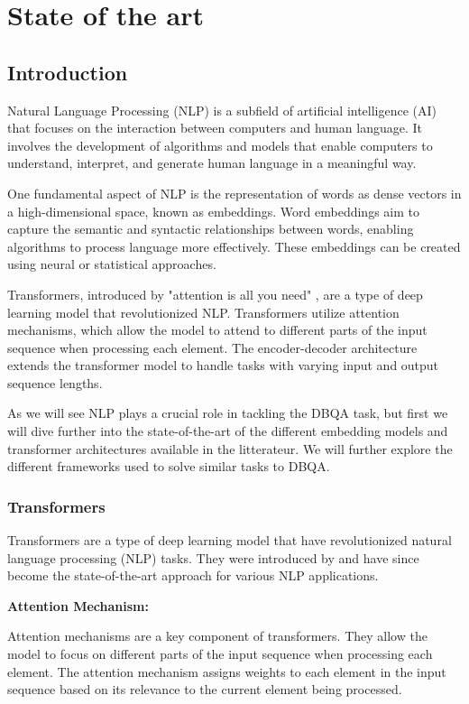 \documentclass[a4paper,12pt]{article}
\begin{document}
\clearpage
\section{State of the art}

\subsection{Introduction}
Natural Language Processing (NLP) is a subfield of artificial intelligence (AI) that focuses on the interaction between computers and human language. 
It involves the development of algorithms and models that enable computers to understand, interpret, and generate human language in a meaningful way.

One fundamental aspect of NLP is the representation of words as dense vectors in a high-dimensional space, known as embeddings. 
Word embeddings aim to capture the semantic and syntactic relationships between words, enabling algorithms to process language more effectively. 
These embeddings can be created using neural or statistical approaches.

Transformers, introduced by "attention is all you need" \cite{attention}, are a type of deep learning model that revolutionized NLP. 
Transformers utilize attention mechanisms, which allow the model to attend to different parts of the input sequence when processing each element. 
The encoder-decoder architecture extends the transformer model to handle tasks with varying input and output sequence lengths.

As we will see NLP plays a crucial role in tackling the DBQA task, but first we will dive further into the state-of-the-art of the different embedding models 
and transformer architectures available in the litterateur. We will further explore the different frameworks used to solve similar tasks to DBQA.  




\subsubsection{Transformers}

Transformers are a type of deep learning model that have revolutionized natural language processing (NLP) tasks. They were introduced by \cite{attention} and have since become the state-of-the-art approach for various NLP applications.

\textbf{Attention Mechanism:}

Attention mechanisms are a key component of transformers. They allow the model to focus on different parts of the input sequence when processing each element. The attention mechanism assigns weights to each element in the input sequence based on its relevance to the current element being processed.
\end{document}
